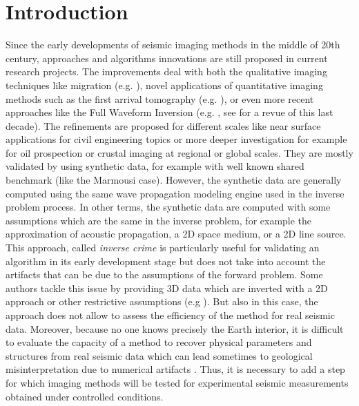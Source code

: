 \documentclass[manuscript,revised]{geophysics}
\begin{document}
\modulolinenumbers[5]
\linenumbers

\section{Introduction}


\noindent Since the early developments of seismic imaging methods in the middle of 20th century, approaches and algorithms innovations are still proposed in current research projects. The improvements deal with both the qualitative imaging techniques like migration (e.g. \citet{Berkhout_MSS_2012,Guofeng_GPU_2013}), novel applications of quantitative imaging methods such as the first arrival tomography (e.g. \citet{Bohm_CWS_2015}), or even more recent approaches like the Full Waveform Inversion (e.g. \citet{Perez_AWI_2014}, see \citet{Virieux_FWI_2009} for a revue of this last decade). The refinements are proposed for different scales like near surface applications for civil engineering topics or more deeper investigation for example for oil prospection or crustal imaging at regional or global scales. They are mostly validated by using synthetic data, for example with well known shared benchmark (like the Marmousi case). However, the synthetic data are generally computed using the same wave propagation modeling engine used in the inverse problem process. In other terms, the synthetic data are computed with some assumptions which are the same in the inverse problem, for example the approximation of acoustic propagation, a 2D space medium, or a 2D line source. This approach, called \textit{inverse crime} \citep{Wirgin_TIC_2004} is particularly useful for validating an algorithm in its early development stage but does not take into account the artifacts that can be due to the assumptions of the forward problem. Some authors tackle this issue by providing 3D data which are inverted with a 2D approach or other restrictive assumptions (e.g ). But also in this case, the approach does not allow to assess the efficiency of the method for real seismic data. Moreover, because no one knows precisely the Earth interior, it is difficult to evaluate the capacity of a method to recover physical parameters and structures from real seismic data which can lead sometimes to geological misinterpretation due to numerical artifacts \citep{Morozov_ARF_2004}. Thus, it is necessary to add a step for which imaging methods will be tested for experimental seismic measurements obtained under controlled conditions.
\end{document}
